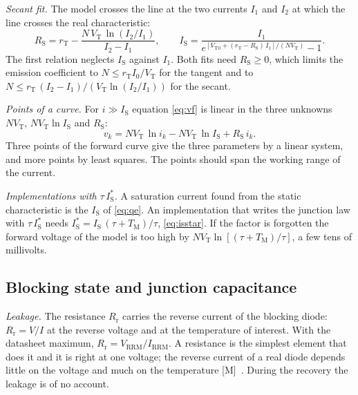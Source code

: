\documentclass[10pt,a4paper]{scrartcl}
\newcommand{\TM}{T_\mathrm{M}}
\newcommand{\IS}{I_\mathrm{S}}
\newcommand{\RS}{R_\mathrm{S}}
\newcommand{\Rr}{R_\mathrm{r}}
\newcommand{\VT}{V_\mathrm{T}}
\newcommand{\VTo}{V_\mathrm{T0}}
\newcommand{\rT}{r_\mathrm{T}}
\newcommand{\Vrrm}{V_\mathrm{RRM}}
\newcommand{\Irrm}{I_\mathrm{RRM}}
\newcommand{\Nem}{N}                          %
\begin{document}
\emph{Secant fit.} The model crosses the line at the two currents $I_1$ and $I_2$ at which the line crosses the real characteristic:
\begin{equation}
\RS = \rT - \frac{\Nem\,\VT\,\ln(I_2/I_1)}{I_2 - I_1} , \qquad \IS = \frac{I_1}{e^{[\VTo + (\rT-\RS)\,I_1]/(\Nem\VT)} - 1} .
\label{eq:secant}
\end{equation}
The first relation neglects $\IS$ against $I_1$. Both fits need $\RS \geq 0$, which limits the emission coefficient to $\Nem \leq \rT I_0/\VT$ for the tangent and to $\Nem \leq \rT\,(I_2-I_1)/(\VT\ln(I_2/I_1))$ for the secant.

\emph{Points of a curve.} For $i \gg \IS$ equation \eqref{eq:vf} is linear in the three unknowns $\Nem\VT$, $\Nem\VT\ln\IS$ and $\RS$:
\begin{equation}
v_k = \Nem\VT\,\ln i_k - \Nem\VT\,\ln\IS + \RS\, i_k .
\label{eq:points}
\end{equation}
Three points of the forward curve give the three parameters by a linear system, and more points by least squares. The points should span the working range of the current.

\emph{Implementations with $\tau\,\IS^{*}$.} A saturation current found from the static characteristic is the $\IS$ of \eqref{eq:qe}. An implementation that writes the junction law with $\tau\,\IS^{*}$ needs $\IS^{*} = \IS\,(\tau+\TM)/\tau$, \eqref{eq:isstar}. If the factor is forgotten the forward voltage of the model is too high by $\Nem\VT\ln[(\tau+\TM)/\tau]$, a few tens of millivolts.

\subsection{Blocking state and junction capacitance}
\label{sec:blocking}
\emph{Leakage.} The resistance $\Rr$ carries the reverse current of the blocking diode: $\Rr = V/I$ at the reverse voltage and at the temperature of interest. With the datasheet maximum, $\Rr = \Vrrm/\Irrm$. A resistance is the simplest element that does it and it is right at one voltage; the reverse current of a real diode depends little on the voltage and much on the temperature [M]~\cite{lutz}. During the recovery the leakage is of no account.
\end{document}
